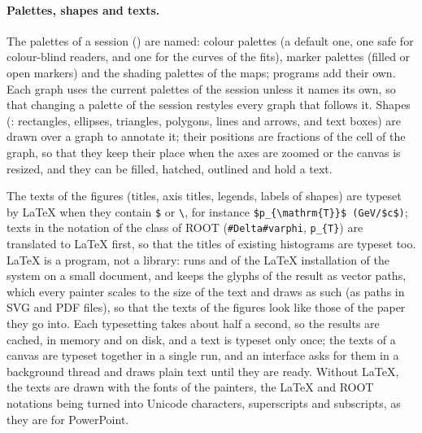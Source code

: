 \paragraph{Palettes, shapes and texts.}
The palettes of a session () are named: colour palettes (a default one, one safe for colour-blind
readers, and one for the curves of the fits), marker palettes (filled or open markers) and the shading palettes of the
maps; programs add their own. Each graph uses the current palettes of the session unless it names its own, so that
changing a palette of the session restyles every graph that follows it. Shapes (: rectangles, ellipses,
triangles, polygons, lines and arrows, and text boxes) are drawn over a graph to annotate it; their positions are
fractions of the cell of the graph, so that they keep their place when the axes are zoomed or the canvas is resized,
and they can be filled, hatched, outlined and hold a text.

The texts of the figures (titles, axis titles, legends, labels of shapes) are typeset by \LaTeX{} when they contain
\verb|$| or \verb|\|, for instance \verb|$p_{\mathrm{T}}$ (GeV/$c$)|; texts in the notation of the 
class of ROOT (\verb|#Delta#varphi|, \verb|p_{T}|) are translated to \LaTeX{} first, so that the titles of existing
histograms are typeset too. \LaTeX{} is a program, not a library:  runs  and
 of the \LaTeX{} installation of the system on a small document, and keeps the glyphs of the result as
vector paths, which every painter scales to the size of the text and draws as such (as paths in SVG and PDF files),
so that the texts of the figures look like those of the paper they go into. Each typesetting takes about half a
second, so the results are cached, in memory and on disk, and a text is typeset only once; the texts of a canvas
are typeset together in a single run, and an interface asks for them in a background thread and draws plain text
until they are ready. Without \LaTeX{}, the texts are drawn with the fonts of the painters, the \LaTeX{} and ROOT
notations being turned into Unicode characters, superscripts and subscripts, as they are for PowerPoint.

